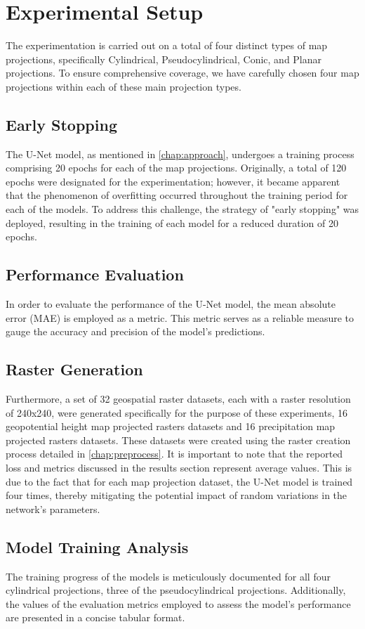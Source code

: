\section{Experimental Setup}
The experimentation is carried out on a total of four distinct types of map projections, specifically Cylindrical, Pseudocylindrical, Conic, and Planar projections.
To ensure comprehensive coverage, we have carefully chosen four map projections within each of these main projection types.

\subsection{Early Stopping}
The U-Net model, as mentioned in \autoref{chap:approach}, undergoes a training process comprising 20 epochs for each of the map projections.
Originally, a total of 120 epochs were designated for the experimentation; however, it became apparent that the phenomenon of overfitting occurred throughout the
training period for each of the models. To address this challenge, the strategy of "early stopping" was deployed, resulting in the training of each model for a reduced
duration of 20 epochs.

\subsection{Performance Evaluation}
In order to evaluate the performance of the U-Net model, the mean absolute error (MAE) is employed as a metric. This metric serves as a reliable measure to gauge
the accuracy and precision of the model's predictions.
\subsection{Raster Generation}
Furthermore, a set of 32 geospatial raster datasets, each with a raster resolution of 240x240, were generated specifically for the purpose of these experiments, 16 geopotential height map projected rasters datasets and 16 precipitation map projected rasters datasets.
These datasets were created using the raster creation process detailed in \autoref{chap:preprocess}.
It is important to note that the reported loss and metrics discussed
in the results section represent average values. This is due to the fact that for each map projection dataset, the U-Net model is trained four times, thereby mitigating
the potential impact of random variations in the network's parameters.
\subsection{Model Training Analysis}
The training progress of the models is meticulously documented for all four cylindrical projections, three of the pseudocylindrical projections.
Additionally, the values of the evaluation metrics employed to assess the model's performance are presented in a concise tabular format.

